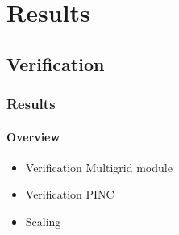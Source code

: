 \documentclass{beamer}
\begin{document}
\section{Results}
\subsection{Verification}

\begin{frame}
	\frametitle{Results}
	\framesubtitle{Overview}
		\begin{itemize}
			\item Verification Multigrid module
			\item Verification PINC
			\item Scaling
		\end{itemize}
\end{frame}
\end{document}

